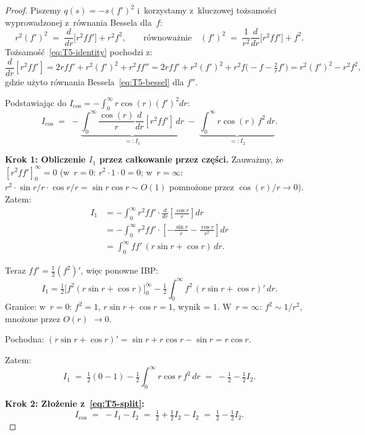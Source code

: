\begin{proof}
Piszemy $q(s) = -s(f')^2$ i~korzystamy z~kluczowej to\.zsamo\'sci wyprowadzonej
z~r\'ownania Bessela dla~$f$:
\begin{equation}\label{eq:T5-identity}
  r^2 (f')^2 \;=\; \frac{d}{dr}\bigl[r^2 f f'\bigr] + r^2 f^2,
  \qquad \text{r\'ownowa\.znie} \quad (f')^2 \;=\; \frac{1}{r^2}\frac{d}{dr}\bigl[r^2 f f'\bigr] + f^2.
\end{equation}
To\.zsamo\'s\'c~\eqref{eq:T5-identity} pochodzi z:
\[
  \frac{d}{dr}[r^2 f f'] = 2r f f' + r^2 (f')^2 + r^2 f f''
  = 2r f f' + r^2 (f')^2 + r^2 f \bigl(-f - \tfrac{2}{r} f'\bigr)
  = r^2 (f')^2 - r^2 f^2,
\]
gdzie u\.zyto r\'ownania Bessela~\eqref{eq:T5-bessel} dla $f''$.

Podstawiaj\k{a}c do $I_{\cos} = -\int_0^\infty r \cos(r) (f')^2 dr$:
\begin{equation}\label{eq:T5-split}
  I_{\cos} \;=\; -\underbrace{\int_0^\infty \frac{\cos(r)}{r}\frac{d}{dr}[r^2 f f']\,dr}_{=: I_1}
  \;-\; \underbrace{\int_0^\infty r \cos(r)\, f^2\, dr}_{=: I_2}.
\end{equation}

\textbf{Krok 1: Obliczenie $I_1$ przez ca\l{}kowanie przez cz\k{e}\'sci.}
Zauwa\.zmy, \.ze $[r^2 f f']_0^\infty = 0$ (w~$r=0$: $r^2 \cdot 1 \cdot 0 = 0$;
w~$r=\infty$: $r^2 \cdot \sin r/r \cdot \cos r/r = \sin r \cos r \sim O(1)$
pomno\.zone przez $\cos(r)/r \to 0$). Zatem:
\begin{align*}
  I_1 &= -\int_0^\infty r^2 f f' \cdot \frac{d}{dr}\!\left[\frac{\cos r}{r}\right] dr \\
      &= -\int_0^\infty r^2 f f' \cdot \left[-\frac{\sin r}{r} - \frac{\cos r}{r^2}\right] dr \\
      &= \int_0^\infty f f'\,(r \sin r + \cos r)\, dr.
\end{align*}

Teraz $f f' = \tfrac{1}{2}(f^2)'$, wi\k{e}c ponowne IBP:
\[
  I_1 = \tfrac{1}{2}\bigl[f^2 (r \sin r + \cos r)\bigr]_0^\infty
        - \tfrac{1}{2}\int_0^\infty f^2\,(r \sin r + \cos r)'\,dr.
\]
Granice: w~$r=0$: $f^2 = 1$, $r\sin r + \cos r = 1$, wynik = $1$.
W~$r=\infty$: $f^2 \sim 1/r^2$, mno\.zone przez $O(r)$ $\to 0$.

Pochodna: $(r\sin r + \cos r)' = \sin r + r \cos r - \sin r = r\cos r$.

Zatem:
\[
  I_1 \;=\; \tfrac{1}{2}(0 - 1) - \tfrac{1}{2}\int_0^\infty r \cos r\, f^2\, dr
  \;=\; -\tfrac{1}{2} - \tfrac{1}{2} I_2.
\]

\textbf{Krok 2: Z\l{}o\.zenie z~\eqref{eq:T5-split}:}
\[
  I_{\cos} \;=\; -I_1 - I_2 \;=\; \tfrac{1}{2} + \tfrac{1}{2} I_2 - I_2 \;=\; \tfrac{1}{2} - \tfrac{1}{2} I_2.
\]


\end{proof}
